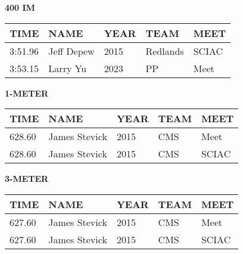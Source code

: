 \vspace{0.4cm}

\begin{center}
\begin{minipage}[t]{0.7\textwidth}
\centering
\textbf{400 IM}\\[0.05cm]
\begin{tabular}{@{}p{1.8cm}p{2.8cm}p{1.2cm}p{1.4cm}p{1.4cm}@{}}
\hline
\textbf{TIME} & \textbf{NAME} & \textbf{YEAR} & \textbf{TEAM} & \textbf{MEET} \\
\hline
3:51.96 & Jeff Depew & 2015 & Redlands & SCIAC \\
3:53.15 & Larry Yu & 2023 & PP & Meet \\
\hline
\end{tabular}
\end{minipage}
\end{center}

\vspace{0.4cm}

\begin{center}
\begin{minipage}[t]{0.7\textwidth}
\centering
\textbf{1-METER}\\[0.05cm]
\begin{tabular}{@{}p{1.8cm}p{2.8cm}p{1.2cm}p{1.4cm}p{1.4cm}@{}}
\hline
\textbf{TIME} & \textbf{NAME} & \textbf{YEAR} & \textbf{TEAM} & \textbf{MEET} \\
\hline
628.60 & James Stevick & 2015 & CMS & Meet \\
628.60 & James Stevick & 2015 & CMS & SCIAC \\
\hline
\end{tabular}
\end{minipage}
\end{center}

\vspace{0.4cm}

\begin{center}
\begin{minipage}[t]{0.7\textwidth}
\centering
\textbf{3-METER}\\[0.05cm]
\begin{tabular}{@{}p{1.8cm}p{2.8cm}p{1.2cm}p{1.4cm}p{1.4cm}@{}}
\hline
\textbf{TIME} & \textbf{NAME} & \textbf{YEAR} & \textbf{TEAM} & \textbf{MEET} \\
\hline
627.60 & James Stevick & 2015 & CMS & Meet \\
627.60 & James Stevick & 2015 & CMS & SCIAC \\
\hline
\end{tabular}
\end{minipage}
\end{center}

